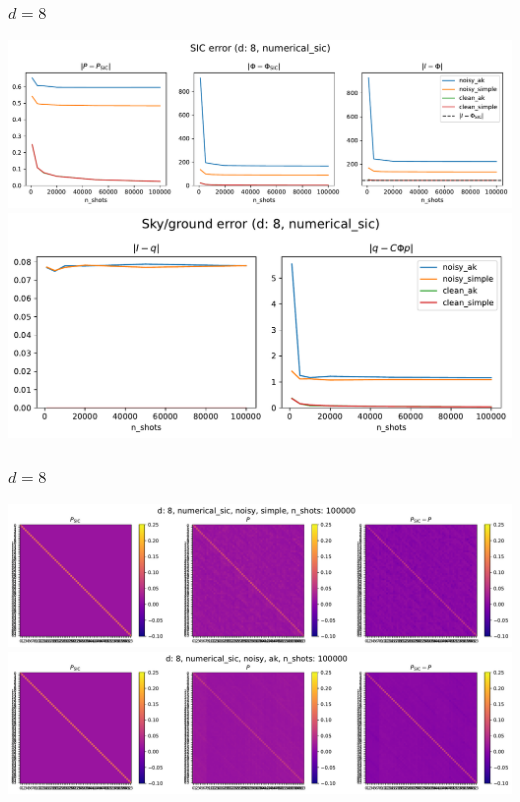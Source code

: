 \documentclass{beamer}
\begin{document}
\begin{frame}
\frametitle{$d=8$}
\begin{center}
\includegraphics[scale=0.35]{img/sic_metrics_d8_numerical_sic}
\includegraphics[scale=0.35]{img/sg_metrics_d8_numerical_sic}		
\end{center}
\end{frame}

\begin{frame}
\frametitle{$d=8$}
\begin{center}
\includegraphics[scale=0.3]{img/P_d8_numerical_sic_noisy_simple_n100000}
\includegraphics[scale=0.3]{img/P_d8_numerical_sic_noisy_ak_n100000}		
\end{center}
\end{frame}
\end{document}
